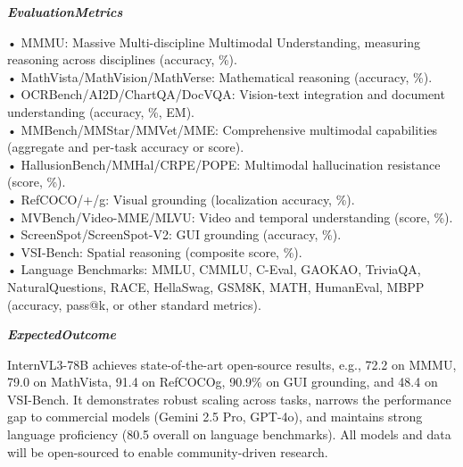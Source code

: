 \begin{tcolorbox}[
    breakable,
    title={Example of Idea Generation in Information},
    colback=LighterGray,
    colframe=DeepPurple,
    colbacktitle=DeepPurple,
    coltitle=White,
]
\textbf{\emph{\textcolor{CaseOrange}{EvaluationMetrics}}}

• MMMU: Massive Multi-discipline Multimodal Understanding, measuring reasoning across disciplines (accuracy, \%). \\
• MathVista/MathVision/MathVerse: Mathematical reasoning (accuracy, \%). \\
• OCRBench/AI2D/ChartQA/DocVQA: Vision-text integration and document understanding (accuracy, \%, EM). \\
• MMBench/MMStar/MMVet/MME: Comprehensive multimodal capabilities (aggregate and per-task accuracy or score). \\
• HallusionBench/MMHal/CRPE/POPE: Multimodal hallucination resistance (score, \%). \\
• RefCOCO/+/g: Visual grounding (localization accuracy, \%). \\
• MVBench/Video-MME/MLVU: Video and temporal understanding (score, \%). \\
• ScreenSpot/ScreenSpot-V2: GUI grounding (accuracy, \%). \\
• VSI-Bench: Spatial reasoning (composite score, \%). \\
• Language Benchmarks: MMLU, CMMLU, C-Eval, GAOKAO, TriviaQA, NaturalQuestions, RACE, HellaSwag, GSM8K, MATH, HumanEval, MBPP (accuracy, pass@k, or other standard metrics). 

\textbf{\emph{\textcolor{CaseOrange}{ExpectedOutcome}}}

InternVL3-78B achieves state-of-the-art open-source results, e.g., 72.2 on MMMU, 79.0 on MathVista,
91.4 on RefCOCOg, 90.9\% on GUI grounding, and 48.4 on VSI-Bench. It demonstrates robust scaling
across tasks, narrows the performance gap to commercial models (Gemini 2.5 Pro, GPT-4o), and
maintains strong language proficiency (80.5 overall on language benchmarks). All models and data
will be open-sourced to enable community-driven research.

\end{tcolorbox}



